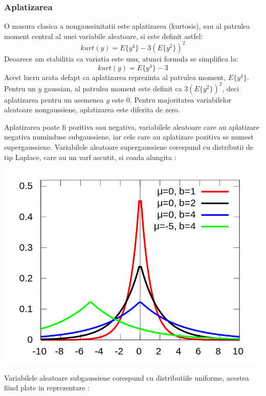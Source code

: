 \documentclass[12pt,oneside]{article}
\begin{document}
\subsubsection{Aplatizarea}
O masura clasica a nongaussinitatii este aplatizarea (kurtosis), sau al patrulea moment central al unei variabile aleatoare, si este definit astfel:
\begin{equation}
kurt(y)=E\{y^4\}-3(E\{y^2\})^2
\end{equation}
Deoarece am stabilitia ca variatia este unu, atunci formula se simplifica la:
\begin{equation}
kurt(y)=E\{y^4\}-3
\end{equation}
Acest lucru arata defapt ca aplatizarea reprezinta al patrulea moment, $E\{y^4\}$. Pentru un $y$ gaussian, al patrulea moment este definit ca $3(E\{y^2\})^2$, deci aplatizarea pentru un asemenea $y$ este 0. Pentru majoritatea variabilelor aleatoare nongaussiene, aplatizarea este diferita de zero.

Aplatizarea poate fi pozitiva sau negativa, variabilele aleatoare care au aplatizare negativa numinduse subgaussiene, iar cele care au aplatizare pozitiva se numest supergaussiene. Variabilele aleatoare supergaussiene corespund cu distributii de tip Laplace, care au un varf ascutit, si coada alungita \cite{laplace_distribution_wiki}:
\begin{center}
	\includegraphics[scale=0.3]{laplace_distribution}
 \end{center}

 Variabilele aleatoare subgaussiene corespund cu distributiile uniforme, acestea fiind plate in reprezentare \cite{uniform_distribution_wolfram}:
\end{document}
